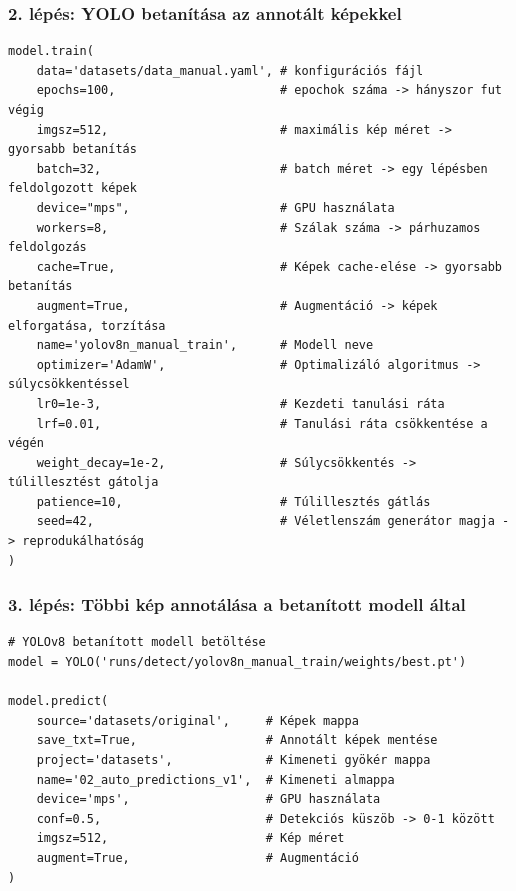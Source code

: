 \documentclass[aspectratio=169]{beamer}
\begin{document}
\begin{frame}[fragile]
	\frametitle{2. lépés: YOLO betanítása az annotált képekkel}

	\begin{verbatim}
model.train(
    data='datasets/data_manual.yaml', # konfigurációs fájl
    epochs=100,                       # epochok száma -> hányszor fut végig
    imgsz=512,                        # maximális kép méret -> gyorsabb betanítás
    batch=32,                         # batch méret -> egy lépésben feldolgozott képek
    device="mps",                     # GPU használata
    workers=8,                        # Szálak száma -> párhuzamos feldolgozás
    cache=True,                       # Képek cache-elése -> gyorsabb betanítás
    augment=True,                     # Augmentáció -> képek elforgatása, torzítása
    name='yolov8n_manual_train',      # Modell neve
    optimizer='AdamW',                # Optimalizáló algoritmus -> súlycsökkentéssel
    lr0=1e-3,                         # Kezdeti tanulási ráta
    lrf=0.01,                         # Tanulási ráta csökkentése a végén
    weight_decay=1e-2,                # Súlycsökkentés -> túlillesztést gátolja
    patience=10,                      # Túlillesztés gátlás
    seed=42,                          # Véletlenszám generátor magja -> reprodukálhatóság
)
\end{verbatim}
\end{frame}

\begin{frame}[fragile]
	\frametitle{3. lépés: Többi kép annotálása a betanított modell által}

	\begin{verbatim}
# YOLOv8 betanított modell betöltése
model = YOLO('runs/detect/yolov8n_manual_train/weights/best.pt')

model.predict(
    source='datasets/original',     # Képek mappa
    save_txt=True,                  # Annotált képek mentése
    project='datasets',             # Kimeneti gyökér mappa
    name='02_auto_predictions_v1',  # Kimeneti almappa
    device='mps',                   # GPU használata
    conf=0.5,                       # Detekciós küszöb -> 0-1 között
    imgsz=512,                      # Kép méret
    augment=True,                   # Augmentáció
)
\end{verbatim}
\end{frame}
\end{document}
